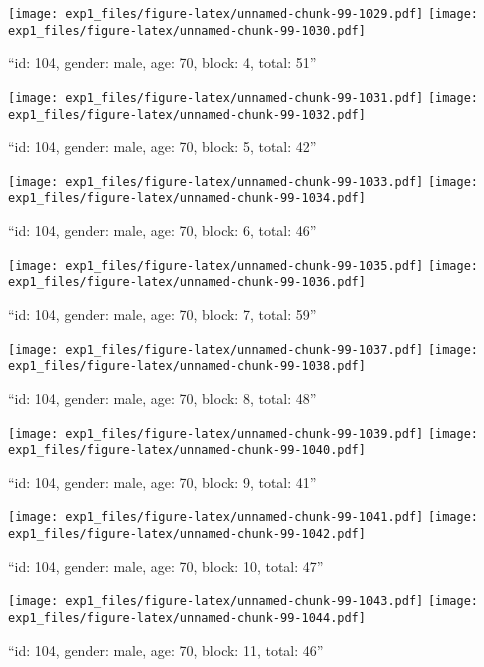 \documentclass[,]{article}
\begin{document}
\texttt{[image: exp1\_files/figure-latex/unnamed-chunk-99-1029.pdf]}
\texttt{[image: exp1\_files/figure-latex/unnamed-chunk-99-1030.pdf]}

\newpage
[1] 

``id: 104, gender: male, age: 70, block: 4, total: 51''

\texttt{[image: exp1\_files/figure-latex/unnamed-chunk-99-1031.pdf]}
\texttt{[image: exp1\_files/figure-latex/unnamed-chunk-99-1032.pdf]}

\newpage
[1] 

``id: 104, gender: male, age: 70, block: 5, total: 42''

\texttt{[image: exp1\_files/figure-latex/unnamed-chunk-99-1033.pdf]}
\texttt{[image: exp1\_files/figure-latex/unnamed-chunk-99-1034.pdf]}

\newpage
[1] 

``id: 104, gender: male, age: 70, block: 6, total: 46''

\texttt{[image: exp1\_files/figure-latex/unnamed-chunk-99-1035.pdf]}
\texttt{[image: exp1\_files/figure-latex/unnamed-chunk-99-1036.pdf]}

\newpage
[1] 

``id: 104, gender: male, age: 70, block: 7, total: 59''

\texttt{[image: exp1\_files/figure-latex/unnamed-chunk-99-1037.pdf]}
\texttt{[image: exp1\_files/figure-latex/unnamed-chunk-99-1038.pdf]}

\newpage
[1] 

``id: 104, gender: male, age: 70, block: 8, total: 48''

\texttt{[image: exp1\_files/figure-latex/unnamed-chunk-99-1039.pdf]}
\texttt{[image: exp1\_files/figure-latex/unnamed-chunk-99-1040.pdf]}

\newpage
[1] 

``id: 104, gender: male, age: 70, block: 9, total: 41''

\texttt{[image: exp1\_files/figure-latex/unnamed-chunk-99-1041.pdf]}
\texttt{[image: exp1\_files/figure-latex/unnamed-chunk-99-1042.pdf]}

\newpage
[1] 

``id: 104, gender: male, age: 70, block: 10, total: 47''

\texttt{[image: exp1\_files/figure-latex/unnamed-chunk-99-1043.pdf]}
\texttt{[image: exp1\_files/figure-latex/unnamed-chunk-99-1044.pdf]}

\newpage
[1] 

``id: 104, gender: male, age: 70, block: 11, total: 46''
\end{document}
